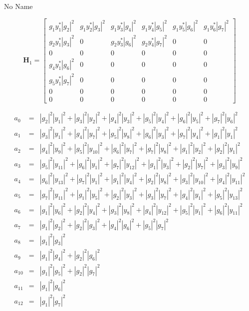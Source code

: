 \documentclass[a4paper,10pt]{article}
\begin{document}
\begin{section}{No Name}

\begin{equation}
\boldsymbol{H}_1 = 
\begin{bmatrix}
g_1y_1^*|g_2|^2&g_1y_2^*|g_3|^2&g_1y_3^*|g_4|^2&g_1y_4^*|g_5|^2&g_1y_5^*|g_6|^2&g_1y_6^*|g_7|^2\\
g_2y_1^*|g_3|^2&0&g_2y_3^*|g_6|^2&g_2y_4^*|g_7|^2&0&0\\
0&0&0&0&0&0\\
g_4y_1^*|g_6|^2&0&0&0&0&0\\
g_5y_1^*|g_7|^2&0&0&0&0&0\\
0&0&0&0&0&0\\
0&0&0&0&0&0
\end{bmatrix}
\end{equation}


\begin{eqnarray}
a_{0} &=& |g_2|^2|y_1|^2 + |g_3|^2|y_2|^2 + |g_4|^2|y_3|^2 + |g_5|^2|y_4|^2 + |g_6|^2|y_5|^2 + |g_7|^2|y_6|^2\\
a_{1} &=& |g_3|^2|y_1|^2 + |g_4|^2|y_7|^2 + |g_5|^2|y_8|^2 + |g_6|^2|y_3|^2 + |g_7|^2|y_4|^2 + |g_1|^2|y_1|^2\\
a_{2} &=& |g_4|^2|y_9|^2 + |g_5|^2|y_10|^2 + |g_6|^2|y_7|^2 + |g_7|^2|y_8|^2 + |g_1|^2|y_2|^2 + |g_2|^2|y_1|^2\\
a_{3} &=& |g_5|^2|y_11|^2 + |g_6|^2|y_1|^2 + |g_7|^2|y_12|^2 + |g_1|^2|y_3|^2 + |g_2|^2|y_7|^2 + |g_3|^2|y_9|^2\\
a_{4} &=& |g_6|^2|y_13|^2 + |g_7|^2|y_1|^2 + |g_1|^2|y_4|^2 + |g_2|^2|y_8|^2 + |g_3|^2|y_10|^2 + |g_4|^2|y_11|^2\\
a_{5} &=& |g_7|^2|y_11|^2 + |g_1|^2|y_5|^2 + |g_2|^2|y_3|^2 + |g_3|^2|y_7|^2 + |g_4|^2|y_1|^2 + |g_5|^2|y_13|^2\\
a_{6} &=& |g_1|^2|y_6|^2 + |g_2|^2|y_4|^2 + |g_3|^2|y_8|^2 + |g_4|^2|y_12|^2 + |g_5|^2|y_1|^2 + |g_6|^2|y_11|^2\\
a_{7} &=& |g_1|^2|g_2|^2 + |g_2|^2|g_3|^2 + |g_4|^2|g_6|^2 + |g_5|^2|g_7|^2\\
a_{8} &=& |g_1|^2|g_3|^2\\
a_{9} &=& |g_1|^2|g_4|^2 + |g_2|^2|g_6|^2\\
a_{10} &=& |g_1|^2|g_5|^2 + |g_2|^2|g_7|^2\\
a_{11} &=& |g_1|^2|g_6|^2\\
a_{12} &=& |g_1|^2|g_7|^2
\end{eqnarray}


\end{section}
\end{document}
